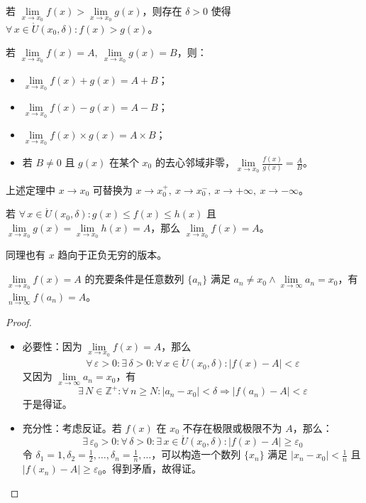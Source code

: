 \begin{corollary}[极限的局部保序性]
	若 $\lim\limits_{x \to x_0} f(x) > \lim\limits_{x \to x_0} g(x)$，则存在 $\delta > 0$ 使得 $\forall\,x \in \mathring{U}(x_0, \delta): f(x) > g(x)$。
\end{corollary}

\begin{theorem}[极限的四则运算法则]
	若 $\lim\limits_{x \to x_0} f(x) = A,\ \lim\limits_{x \to x_0} g(x) = B$，则：

	\begin{itemize}
		\item $\lim\limits_{x \to x_0} f(x) + g(x) = A + B$；
		\item $\lim\limits_{x \to x_0} f(x) - g(x) = A - B$；
		\item $\lim\limits_{x \to x_0} f(x) \times g(x) = A \times B$；
		\item 若 $B \neq 0$ 且 $g(x)$ 在某个 $x_0$ 的去心邻域非零，$\lim\limits_{x \to x_0} \frac{f(x)}{g(x)} = \frac{A}{B}$。
	\end{itemize}
\end{theorem}

上述定理中 $x \to x_0$ 可替换为 $x \to x_0^+,\ x \to x_0^-,\ x \to +\infty,\ x \to -\infty$。

\begin{theorem}[夹逼定理]
	若 $\forall\,x \in \mathring{U}(x_0, \delta): g(x) \le f(x) \le h(x)$ 且 $\lim\limits_{x \to x_0} g(x) = \lim\limits_{x \to x_0} h(x) = A$，那么 $\lim\limits_{x \to x_0} f(x) = A$。

	同理也有 $x$ 趋向于正负无穷的版本。
\end{theorem}

\begin{theorem}[Heine 定理]
	$\lim\limits_{x \to x_0} f(x) = A$ 的充要条件是任意数列 $\{a_n\}$ 满足 $a_n \neq x_0 \land \lim\limits_{x \to \infty} a_n = x_0$，有 $\lim\limits_{n \to \infty} f(a_n) = A$。

	\begin{proof}
		\begin{itemize}
			\item 必要性：因为 $\lim\limits_{x \to x_0} f(x) = A$，那么
			$$
			\forall\,\varepsilon > 0: \exists\,\delta > 0: \forall\,x \in \mathring{U}(x_0, \delta): |f(x) - A| < \varepsilon
			$$
			又因为 $\lim\limits_{x \to \infty} a_n = x_0$，有
			$$
			\exists\,N \in \mathbb{Z}^+: \forall\,n \ge N: |a_n - x_0| < \delta \Rightarrow |f(a_n) - A|<\varepsilon
			$$
			于是得证。

			\item 充分性：考虑反证。若 $f(x)$ 在 $x_0$ 不存在极限或极限不为 $A$，那么：
			$$
			\exists\,\varepsilon_0 > 0: \forall\,\delta > 0: \exists\,x \in \mathring{U}(x_0, \delta): |f(x) - A| \ge \varepsilon_0
			$$
			令 $\delta_1 = 1, \delta_2 = \frac{1}{2}, \dots, \delta_n = \frac{1}{n}, \dots$，可以构造一个数列 $\{x_n\}$ 满足 $|x_n - x_0| < \frac{1}{n}$ 且 $|f(x_n) - A| \ge \varepsilon_0$。得到矛盾，故得证。
		\end{itemize}
	\end{proof}
\end{theorem}

